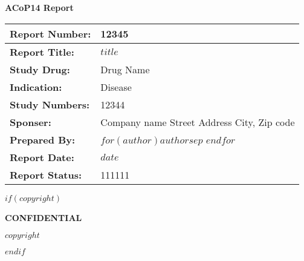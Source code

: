 \thispagestyle{empty} 
\vskip2cm 
{\centerline{\textbf{ACoP14 Report}}} 
\vskip2cm 
\begin{table}[!h]
      \setlength{\tabcolsep}{5pt}  
      \renewcommand{\arraystretch}{1.5}
      \begin{tabularx}{\textwidth}{lX}
            \midrule
            \textbf{Report Number:} & 12345 \\ 
            \midrule
            \textbf{Report Title:} & $title$ \\ 
            \midrule 
            \textbf{Study Drug:} &  Drug Name\\ 
            \midrule
            \textbf{Indication:} & Disease\\ 
            \midrule 
            \textbf{Study Numbers:} & 12344\\ 
            \midrule 
            \textbf{Sponser:} & Company name \newline 
                        Street Address \newline
                       City, Zip code\newline 
                       \\ 
            \midrule 
            \textbf{Prepared By:} & $for(author)$$author$$sep$ \newline $endfor$\\ 
            \midrule 
            \textbf{Report Date:} & $date$\\ 
            \midrule 
            \textbf{Report Status:}  & 111111 \\
            \midrule 
      \end{tabularx}
\end{table}

\vskip0.5cm 
$if(copyright)$
\begin{center}
{\textbf{CONFIDENTIAL}} 
\begin{mdframed} 
    {\normalsize $copyright$}
\end{mdframed}
\end{center}
$endif$ 